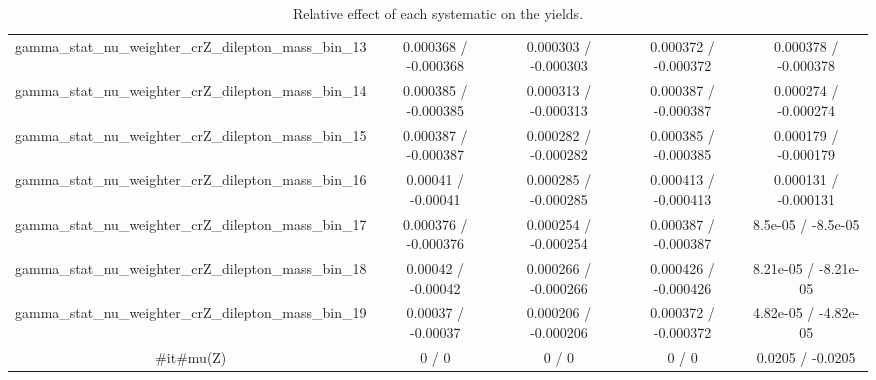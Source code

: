 \documentclass[10pt]{article}
\begin{document}
\begin{table}[htbp]
\begin{center}
\begin{tabular}{|c|c|c|c|c|}
  gamma_stat_nu_weighter_crZ_dilepton_mass_bin_13 & 0.000368 / -0.000368 & 0.000303 / -0.000303 & 0.000372 / -0.000372 & 0.000378 / -0.000378 \\ 
  gamma_stat_nu_weighter_crZ_dilepton_mass_bin_14 & 0.000385 / -0.000385 & 0.000313 / -0.000313 & 0.000387 / -0.000387 & 0.000274 / -0.000274 \\ 
  gamma_stat_nu_weighter_crZ_dilepton_mass_bin_15 & 0.000387 / -0.000387 & 0.000282 / -0.000282 & 0.000385 / -0.000385 & 0.000179 / -0.000179 \\ 
  gamma_stat_nu_weighter_crZ_dilepton_mass_bin_16 & 0.00041 / -0.00041 & 0.000285 / -0.000285 & 0.000413 / -0.000413 & 0.000131 / -0.000131 \\ 
  gamma_stat_nu_weighter_crZ_dilepton_mass_bin_17 & 0.000376 / -0.000376 & 0.000254 / -0.000254 & 0.000387 / -0.000387 & 8.5e-05 / -8.5e-05 \\ 
  gamma_stat_nu_weighter_crZ_dilepton_mass_bin_18 & 0.00042 / -0.00042 & 0.000266 / -0.000266 & 0.000426 / -0.000426 & 8.21e-05 / -8.21e-05 \\ 
  gamma_stat_nu_weighter_crZ_dilepton_mass_bin_19 & 0.00037 / -0.00037 & 0.000206 / -0.000206 & 0.000372 / -0.000372 & 4.82e-05 / -4.82e-05 \\ 
  #it{#mu}(Z) & 0 / 0 & 0 / 0 & 0 / 0 & 0.0205 / -0.0205 \\ 
\hline 
\end{tabular} 
\caption{Relative effect of each systematic on the yields.} 
\end{center} 
\end{table} 
\end{document}
